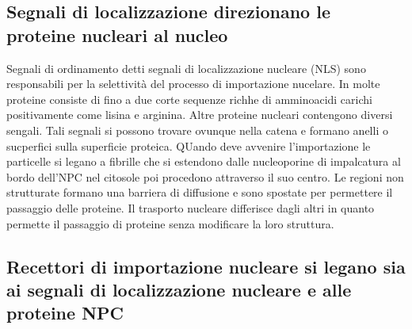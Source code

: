 \subsection{Segnali di localizzazione direzionano le proteine nucleari al nucleo}
Segnali di ordinamento detti segnali di localizzazione nucleare (NLS) sono responsabili per la selettivit\`a del processo di importazione nucelare. In molte proteine consiste di fino a
due corte sequenze richhe di amminoacidi carichi positivamente come lisina e arginina. Altre proteine nucleari contengono diversi sengali. Tali segnali si possono trovare ovunque nella
catena e formano anelli o sucperfici sulla superficie proteica. QUando deve avvenire l'importazione le particelle si legano a fibrille che si estendono dalle nucleoporine di impalcatura
al bordo dell'NPC nel citosole poi procedono attraverso il suo centro. Le regioni non strutturate formano una barriera di diffusione e sono spostate per permettere il passaggio delle
proteine. Il trasporto nucleare differisce dagli altri in quanto permette il passaggio di proteine senza modificare la loro struttura.
\subsection{Recettori di importazione nucleare si legano sia ai segnali di localizzazione nucleare e alle proteine NPC}

